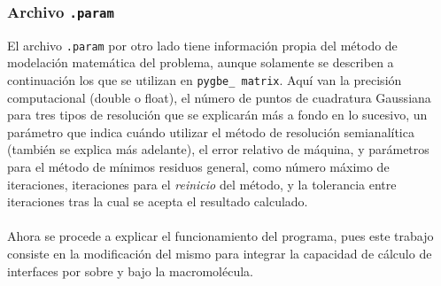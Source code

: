 \documentclass[12pt, twoside, onehalfspace, numbers, spanish]{ezthesis}
\numberwithin{equation}{section}
\begin{document}
\subsubsection{Archivo \texttt{.param}}
El archivo \texttt{.param} por otro lado tiene información propia del método de modelación matemática del problema, aunque solamente se describen a continuación los que se utilizan en \texttt{pygbe\_ matrix}. Aquí van la precisión computacional (double o float), el número de puntos de cuadratura Gaussiana para tres tipos de resolución que se explicarán más a fondo en lo sucesivo, un parámetro que indica cuándo utilizar el método de resolución semianalítica (también se explica más adelante), el error relativo de máquina, y parámetros para el método de mínimos residuos general, como número máximo de iteraciones, iteraciones para el \textit{reinicio} del método, y la tolerancia entre iteraciones tras la cual se acepta el resultado calculado.\\\\
Ahora se procede a explicar el funcionamiento del programa, pues este trabajo consiste en la modificación del mismo para integrar la capacidad de cálculo de interfaces por sobre y bajo la macromolécula.
\end{document}
